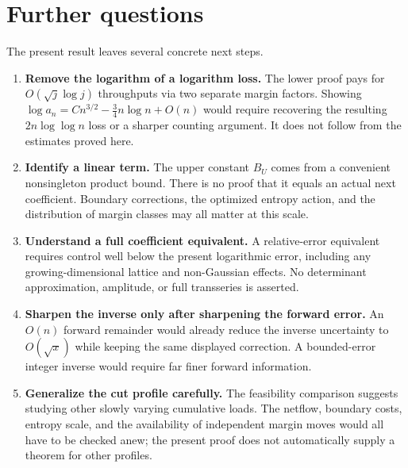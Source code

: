 \documentclass[11pt,a4paper]{article}
\theoremstyle{remark}\newtheorem{remark}[theorem]{Remark}
\numberwithin{equation}{section}
\begin{document}
\section{Further questions}\label{tes:sec:questions}
The present result leaves several concrete next steps.
\begin{enumerate}[leftmargin=*,itemsep=5pt]
\item \textbf{Remove the logarithm of a logarithm loss.} The lower proof pays for $O(\sqrt j\log j)$ throughputs via two separate margin factors. Showing $\log a_n=Cn^{3/2}-\tfrac34n\log n+O(n)$ would require recovering the resulting $2n\log\log n$ loss or a sharper counting argument. It does not follow from the estimates proved here.
\item \textbf{Identify a linear term.} The upper constant $B_U$ comes from a convenient nonsingleton product bound. There is no proof that it equals an actual next coefficient. Boundary corrections, the optimized entropy action, and the distribution of margin classes may all matter at this scale.
\item \textbf{Understand a full coefficient equivalent.} A relative-error equivalent requires control well below the present logarithmic error, including any growing-dimensional lattice and non-Gaussian effects. No determinant approximation, amplitude, or full transseries is asserted.
\item \textbf{Sharpen the inverse only after sharpening the forward error.} An $O(n)$ forward remainder would already reduce the inverse uncertainty to $O(\sqrt x)$ while keeping the same displayed correction. A bounded-error integer inverse would require far finer forward information.
\item \textbf{Generalize the cut profile carefully.} The feasibility comparison suggests studying other slowly varying cumulative loads. The netflow, boundary costs, entropy scale, and the availability of independent margin moves would all have to be checked anew; the present proof does not automatically supply a theorem for other profiles.
\end{enumerate}
\end{document}
